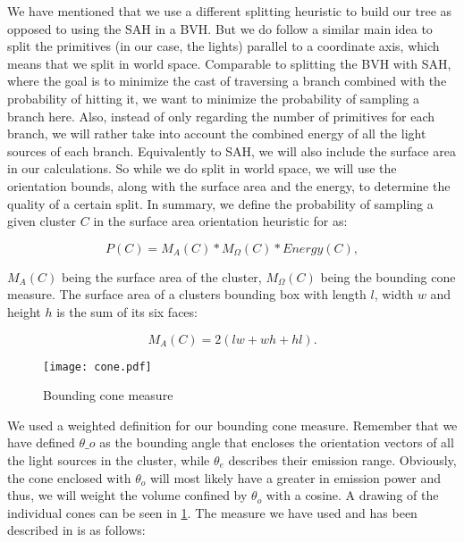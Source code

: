 We have mentioned that we use a different splitting heuristic to build our tree as opposed to using the SAH in a BVH. But we do follow a similar main idea to split the primitives (in our case, the lights) parallel to a coordinate axis, which means that we split in world space. Comparable to splitting the BVH with SAH, where the goal is to minimize the cast of traversing a branch combined with the probability of hitting it, we want to minimize the probability of sampling a branch here. Also, instead of only regarding the number of primitives for each branch, we will rather take into account the combined energy of all the light sources of each branch. Equivalently to SAH, we will also include the surface area in our calculations. So while we do split in world space, we will use the orientation bounds, along with the surface area and the energy, to determine the quality of a certain split. In summary, we define the probability of sampling a given cluster $C$ in the surface area orientation heuristic for as:

\begin{equation}
P(C) = M_A(C) * M_\Omega(C) * Energy(C),
\end{equation}

$M_A(C)$ being the surface area of the cluster, $M_\Omega(C)$ being the bounding cone measure. The surface area of a clusters bounding box with length $l$, width $w$ and height $h$ is the sum of its six faces:

\begin{equation}
M_A(C) = 2(lw + wh + hl).
\end{equation}

\begin{figure}
	\begin{center}
		\texttt{[image: cone.pdf]}
		\caption{Bounding cone measure}
		\label{fig:cone}
	\end{center}
\end{figure}

We used a weighted definition for our bounding cone measure. Remember that we have defined $\theta\_o$ as the bounding angle that encloses the orientation vectors of all the light sources in the cluster, while $\theta_e$ describes their emission range. Obviously, the cone enclosed with $\theta_o$ will most likely have a greater in emission power and thus, we will weight the volume confined by $\theta_o$ with a cosine. A drawing of the individual cones can be seen in \ref{fig:cone}. The measure we have used and has been described in \Cite{MLS} is as follows:

